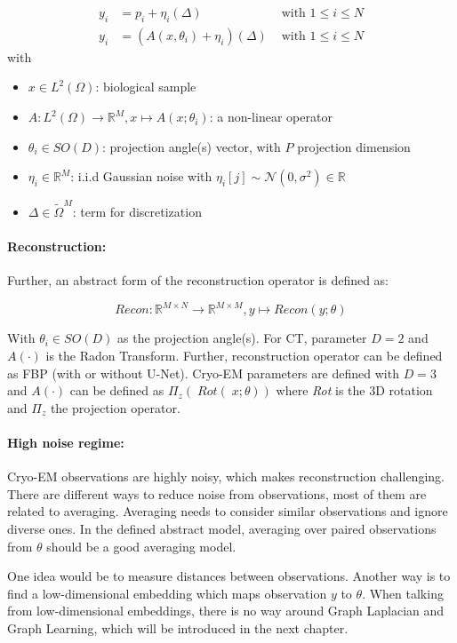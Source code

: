 \begin{equation}
    \label{eq:abstract-model}
    \begin{aligned}
        y_i &= p_i + \eta_i (\Delta) & \text{ with } 1 \leq i \leq N \\
        y_i &= \left( A(x, \theta_i) + \eta_i \right) (\Delta) & \text{ with } 1 \leq i \leq N 
    \end{aligned}
\end{equation}
with
\begin{itemize}
    \item $x \in L^2(\Omega)$: biological sample
    \item $A: L^2(\Omega) \to \mathbb{R}^M, x \mapsto A(x; \theta_i)$: a non-linear operator 
    \item $\theta_i \in SO(D)$: projection angle(s) vector, with $P$ projection dimension
    \item $\eta_i \in \mathbb{R}^M$: i.i.d Gaussian noise with $\eta_i[j] \sim \mathcal{N}(0,\sigma^2) \in \mathbb{R}$
    \item $\Delta \in \tilde{\Omega}^{M}$: term for discretization
\end{itemize}

\paragraph{Reconstruction:}

Further, an abstract form of the reconstruction operator is defined as:

\begin{equation}
    \textit{Recon} : \mathbb{R}^{M \times N} \to \mathbb{R}^{M \times M}, y \mapsto Recon(y; \theta)
\end{equation}

With $\theta_i \in SO(D)$ as the projection angle(s).
For CT, parameter $D=2$ and $A(\cdot)$ is the Radon Transform.
Further, reconstruction operator can be defined as FBP (with or without U-Net).
Cryo-EM parameters are defined with $D=3$ and $A(\cdot)$ can be
defined as $\Pi_z \left(\; \textit{Rot}(\;x; \theta) \right)$ 
where \textit{Rot} is the 3D rotation and $\Pi_z$ the projection operator.


\paragraph{High noise regime:}
Cryo-EM observations are highly noisy, which makes reconstruction challenging. 
There are different ways to reduce noise from observations, most of them are related to averaging. 
Averaging needs to consider similar observations and ignore diverse ones. 
In the defined abstract model, averaging over paired observations from $\theta$ should be a good averaging model.

One idea would be to measure distances between observations.
Another way is to find a low-dimensional embedding which maps observation $y$ to $\theta$.
When talking from low-dimensional embeddings, there is no way around Graph Laplacian and Graph Learning,
which will be introduced in the next chapter.
